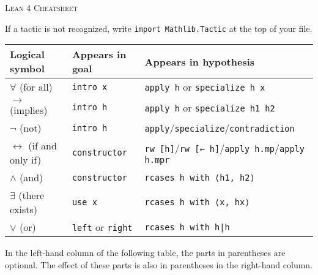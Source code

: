 \documentclass[a4paper]{article}
\newcommand{\lean}[1]{{\tt #1}}
\newcommand{\nv}{\textit{new\_name}\xspace}
\newcommand{\nom}{\textit{name}\xspace}
\newcommand{\expr}{\textit{expr}\xspace}
\begin{document}
\pagestyle{empty}
\begin{center}
 \large\textsc{Lean 4 Cheatsheet}
\end{center}

If a tactic is not recognized, write \lean{import Mathlib.Tactic} at the top of your file.

\begin{center}
\setlength\tabcolsep{5mm}
\def\arraystretch{1.3}
\begin{tabular}{@{}lll@{}}
  \toprule
  Logical symbol & Appears in goal & Appears in hypothesis \\
  \midrule
  $\forall$ (for all) & \lean{intro x} & \lean{apply h} or \lean{specialize h x}  \\
  $\to$ (implies) & \lean{intro h} & \lean{apply h} or \lean{specialize h1 h2} \\
  $\neg$ (not) & \lean{intro h} & \lean{apply}/\lean{specialize}/\lean{contradiction}  \\
  $\leftrightarrow$ (if and only if)\qquad & \lean{constructor}  & \lean{rw [h]}/\lean{rw [← h]}/\lean{apply h.mp}/\lean{apply h.mpr}\\
  $\wedge$ (and) & \lean{constructor} & \lean{rcases h with ⟨h1, h2⟩} \\
  $\exists$ (there exists) & \lean{use x} & \lean{rcases h with ⟨x, hx⟩} \\
  $\vee$ (or) & \lean{left} or \lean{right} & \lean{rcases h with h|h} \\
\bottomrule
\end{tabular}
\end{center}

\medskip
In the left-hand column of the following table,
the parts in parentheses are optional.
The effect of these parts is also in parentheses in the right-hand column.
\vspace{-3mm}
\end{document}
